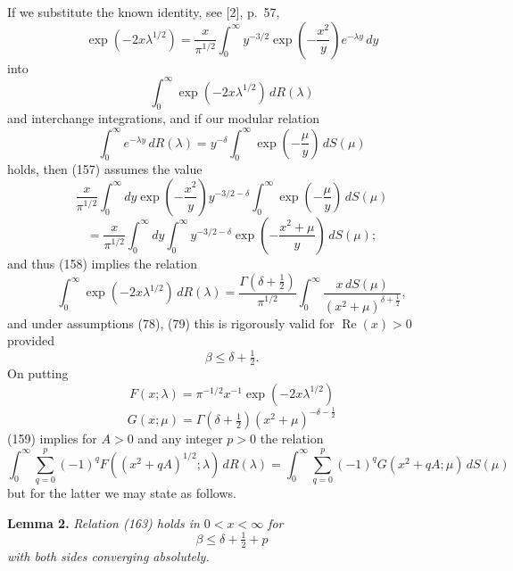 \documentclass[12pt]{article}
\begin{document}
If we substitute the known identity, see [2], p.~57,
\begin{equation}
\exp(-2x\lambda^{1/2}) = \frac{x}{\pi^{1/2}} \int_0^{\infty} y^{-3/2} \exp\left(-\frac{x^2}{y}\right) e^{-\lambda y} \, dy
\tag{156}
\end{equation}
into
\begin{equation}
\int_0^{\infty} \exp(-2x\lambda^{1/2}) \, dR(\lambda)
\tag{157}
\end{equation}
and interchange integrations, and if our modular relation
\begin{equation}
\int_0^{\infty} e^{-\lambda y} \, dR(\lambda) = y^{-\delta} \int_0^{\infty} \exp\left(-\frac{\mu}{y}\right) \, dS(\mu)
\tag{158}
\end{equation}
holds, then (157) assumes the value
\[
\frac{x}{\pi^{1/2}} \int_0^{\infty} dy \exp\left(-\frac{x^2}{y}\right) y^{-3/2-\delta} \int_0^{\infty} \exp\left(-\frac{\mu}{y}\right) \, dS(\mu)
\]
\[
= \frac{x}{\pi^{1/2}} \int_0^{\infty} dy \int_0^{\infty} y^{-3/2-\delta} \exp\left(-\frac{x^2 + \mu}{y}\right) \, dS(\mu);
\]
and thus (158) implies the relation
\begin{equation}
\int_0^{\infty} \exp(-2x\lambda^{1/2}) \, dR(\lambda) = \frac{\Gamma(\delta + \tfrac{1}{2})}{\pi^{1/2}} \int_0^{\infty} \frac{x \, dS(\mu)}{(x^2 + \mu)^{\delta + \tfrac{1}{2}}},
\tag{159}
\end{equation}
and under assumptions (78), (79) this is rigorously valid for \(\operatorname{Re}(x) > 0\) provided
\begin{equation}
\beta \le \delta + \tfrac{1}{2}.
\tag{160}
\end{equation}
On putting
\begin{equation}
F(x; \lambda) = \pi^{-1/2} x^{-1} \exp(-2x\lambda^{1/2})
\tag{161}
\end{equation}
\begin{equation}
G(x; \mu) = \Gamma(\delta + \tfrac{1}{2}) (x^2 + \mu)^{-\delta - \tfrac{1}{2}}
\tag{162}
\end{equation}
(159) implies for \(A > 0\) and any integer \(p > 0\) the relation
\begin{equation}
\int_0^{\infty} \sum_{q=0}^p (-1)^q F((x^2 + qA)^{1/2}; \lambda) \, dR(\lambda)
= \int_0^{\infty} \sum_{q=0}^p (-1)^q G(x^2 + qA; \mu) \, dS(\mu)
\tag{163}
\end{equation}
but for the latter we may state as follows.

\medskip

\noindent\textbf{Lemma 2.} \emph{Relation (163) holds in \(0 < x < \infty\) for}
\begin{equation}
\beta \le \delta + \tfrac{1}{2} + p
\tag{164}
\end{equation}
\emph{with both sides converging absolutely.}
\end{document}
